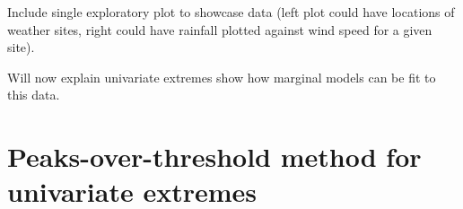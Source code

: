 \documentclass{article}
\numberwithin{equation}{section}
\begin{document}



Include single exploratory plot to showcase data (left plot could have locations of weather sites, right could have rainfall plotted against wind speed for a given site).

Will now explain univariate extremes show how marginal models can be fit to this data.

\section{Peaks-over-threshold method for univariate extremes}\label{sec:uni}
\end{document}
